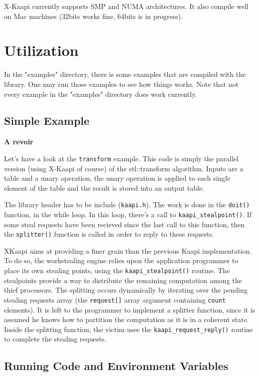 \documentclass{article}
\newcommand{\kaapi}{\textsc{X}-Kaapi\xspace}
\begin{document}
\kaapi currently supports SMP and NUMA architectures. It also compile well on Mac machines (32bits works fine, 64bits is in progress).

\section{Utilization}

In the "examples" directory, there is some examples that are compiled with the library. One may run those examples to see how things works.
Note that not every example in the "examples" directory does work currently.

\subsection{Simple Example}
\textbf{A revoir}
\begin{it}
Let's have a look at the \verb+transform+ example. This code is simply the parallel version (using \kaapi  of course) of the stl::transform
algorithm. Inputs are a table and a unary operation, the unary operation is applied to each single element of the table and the result is stored into an output table.

The library header has to be include (\verb+kaapi.h+). The work is done in the \verb+doit()+ function, in the while loop. In this loop, there's a call to \verb+kaapi_stealpoint()+. If some steal requests have been recieved since the last call to this function, then the \verb+splitter()+ function is called in order to reply to these requests.

XKaapi aims at providing a finer grain than the previous Kaapi implementation. To do so, the workstealing engine relies upon the application programmer to place its own stealing points, using the \verb+kaapi_stealpoint()+ routine. The stealpoints provide a way to distribute the remaining computation among the thief processors. The splitting occurs dynamically by iterating over the pending stealing requests array (the \verb+request[]+ array argument containing \verb+count+ elements). It is left to the programmer to implement a splitter function, since it is assumed he knows how to partition the computation as it is in a coherent state. Inside the splitting function, the victim uses the \verb+kaapi_request_reply()+ routine to complete the stealing requests.
\end{it}


\subsection{Running Code and Environment Variables}
\end{document}
